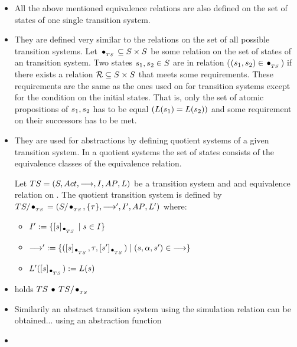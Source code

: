 \documentclass[preview]{standalone}
\begin{document}
\begin{itemize}
	\item All the above mentioned equivalence relations are also defined on the set of states of one single transition system. 
	\item They are defined very similar to the relations on the set of all possible transition systems. Let ${\;\!\bullet_{_{\tiny{TS}}}\;\!} \subseteq {S} \times {S}$ be some relation on the set of states \states of an transition system. Two states ${s}_1,{s}_2 \in {S}$ are in relation ($({s}_1, {s}_2) \in {\;\!\bullet_{_{\tiny{TS}}}\;\!}$) if there exists a relation ${\mathcal{R}} \subseteq {S} \times {S}$ that meets some requirements. These requirements are the same as the ones used on \mimicrel for transition systems except for the condition on the initial states. That is, only the set of atomic propositions of ${s}_1, {s}_2$ has to be equal $({L}({s}_1) = {L}({s}_2))$ and some requirement on their successors has to be met.
	\item They are used for abstractions by defining quotient systems of a given transition system. In a quotient systems the set of states consists of the equivalence classes of the equivalence relation.
	\begin{definition}
		Let ${TS} = {({S}, {Act}, {\longrightarrow}, {I}, {AP}, {L})}$ be a transition system and \relts and equivalence relation on \states. The quotient transition system is defined by $TS/{\;\!\bullet_{_{\tiny{TS}}}\;\!} = ({S}/{\;\!\bullet_{_{\tiny{TS}}}\;\!}, \{\tau\}, {\longrightarrow}', {I}', {AP}, {L}')$ where:
		\begin{itemize}
			\item ${I}' := \{{[{s}]_{{\;\!\bullet_{_{\tiny{TS}}}\;\!}}} \mid {s} \in {I}\}$
			\item ${\longrightarrow}':= \{({[{s}]_{{\;\!\bullet_{_{\tiny{TS}}}\;\!}}}, \tau, {[{s}']_{{\;\!\bullet_{_{\tiny{TS}}}\;\!}}}) \mid ({s}, {\alpha}, {s}') \in {\longrightarrow}\}$
			\item ${L}'({[{s}]_{{\;\!\bullet_{_{\tiny{TS}}}\;\!}}}) := {L}({s})$
		\end{itemize}
	\end{definition}
	
	
	
	
	\item holds ${TS} \; {\;\!\bullet\;\!} \; {TS}/{\;\!\bullet_{_{\tiny{TS}}}\;\!}$
	
	\item Similarily an abstract transition system using the simulation relation can be obtained... using an abstraction function
	
	\item {}
	

\end{itemize}
\end{document}
